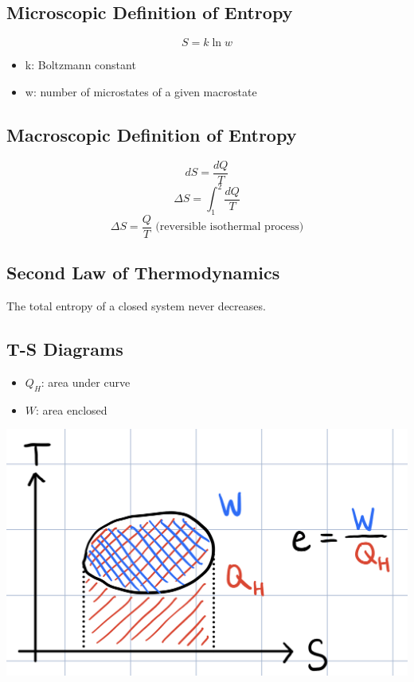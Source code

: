 \documentclass{article}
\begin{document}
\subsection{Microscopic Definition of Entropy}
\[S=k\ln w\]
\begin{itemize}
    \item k: Boltzmann constant
    \item w: number of microstates of a given macrostate
\end{itemize}

\subsection{Macroscopic Definition of Entropy}
\[dS=\frac{dQ}{T}\]
\[\Delta S=\int_{1}^2 \frac{dQ}{T}\]
\[\Delta S=\frac{Q}{T} \text{ (reversible isothermal process)}\]

\subsection{Second Law of Thermodynamics}
The total entropy of a closed system never decreases.

\subsection{T-S Diagrams}
\begin{itemize}
    \item $Q_H$: area under curve
    \item $W$: area enclosed
\end{itemize}
\begin{center}
    \includegraphics[scale=0.1]{images/T-S_diagram.jpg}
\end{center}
\end{document}
